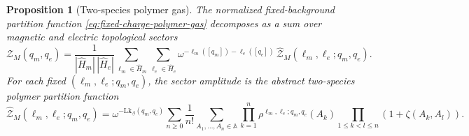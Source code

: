 \documentclass[dvipsnames,a4paper]{article}
\numberwithin{equation}{section}
\newtheorem{prop}[theorem]{Proposition}
\theoremstyle{definition}
\theoremstyle{remark}
\newcommand{\Lk}{\mathrm{Lk}}
\begin{document}
\begin{prop}[Two-species polymer gas]
	\label{prop:fourier-resolved-polymer-gas}
	The normalized fixed-background partition function \eqref{eq:fixed-charge-polymer-gas} decomposes as a sum over magnetic and electric topological sectors
	\begin{equation}
		\mathcal Z_M(q_m,q_e)
		=
		\frac{1}{|\widehat H_m|\,|\widehat H_e|}
		\sum_{\ell_m\in \widehat H_m}
		\sum_{\ell_e\in \widehat H_e}
		\omega^{-\ell_m([q_m])-\ell_e([q_e])}\,
		\widehat{\mathcal Z}_M(\ell_m,\ell_e;q_m,q_e).
		\label{eq:Zme-deltaResolved}
	\end{equation}
	For each fixed \((\ell_m,\ell_e;q_m,q_e)\), the sector amplitude is the abstract
	two-species polymer partition function
	\begin{equation}
		\widehat{\mathcal Z}_M(\ell_m,\ell_e;q_m,q_e)
		=
		\omega^{-\Lk_{\underline\Lambda}(q_m,q_e)}
		\sum_{n\ge 0}
		\frac{1}{n!}
		\sum_{A_1,\dots,A_n\in\mathbb A}
		\prod_{k=1}^n \rho^{\ell_m,\ell_e;q_m,q_e}(A_k)
		\prod_{1\le k<l\le n}\left(1+\zeta(A_k,A_l)\right).
		\label{eq:Zlmle}
	\end{equation}
\end{prop}
\end{document}
